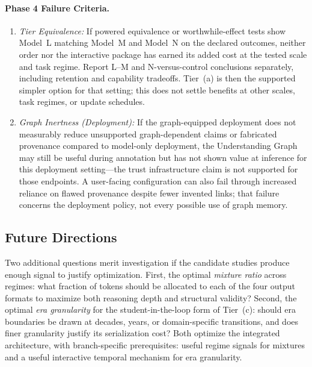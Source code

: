 \paragraph{Phase 4 Failure Criteria.}
\begin{enumerate}
    \item \emph{Tier Equivalence:} If powered equivalence or worthwhile-effect tests show Model~L matching Model~M and Model~N on the declared outcomes, neither order nor the interactive package has earned its added cost at the tested scale and task regime. Report L--M and N-versus-control conclusions separately, including retention and capability tradeoffs. Tier~(a) is then the supported simpler option for that setting; this does not settle benefits at other scales, task regimes, or update schedules.
    \item \emph{Graph Inertness (Deployment):} If the graph-equipped deployment does not measurably reduce unsupported graph-dependent claims or fabricated provenance compared to model-only deployment, the Understanding Graph may still be useful during annotation but has not shown value at inference for this deployment setting---the trust infrastructure claim is not supported for those endpoints. A user-facing configuration can also fail through increased reliance on flawed provenance despite fewer invented links; that failure concerns the deployment policy, not every possible use of graph memory.
\end{enumerate}


\subsection{Future Directions}

Two additional questions merit investigation if the candidate studies produce enough signal to justify optimization. First, the optimal \emph{mixture ratio} across regimes: what fraction of tokens should be allocated to each of the four output formats to maximize both reasoning depth and structural validity? Second, the optimal \emph{era granularity} for the student-in-the-loop form of Tier~(c): should era boundaries be drawn at decades, years, or domain-specific transitions, and does finer granularity justify its serialization cost? Both optimize the integrated architecture, with branch-specific prerequisites: useful regime signals for mixtures and a useful interactive temporal mechanism for era granularity.

